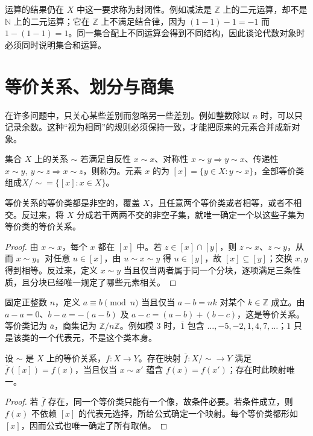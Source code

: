\documentclass[UTF8,12pt,a4paper,fontset=fandol]{ctexbook}
\begin{document}
运算的结果仍在 $X$ 中这一要求称为封闭性。例如减法是 $\mathbb Z$ 上的二元运算，却不是 $\mathbb N$ 上的二元运算；它在 $\mathbb Z$ 上不满足结合律，因为 $(1-1)-1=-1$ 而 $1-(1-1)=1$。同一集合配上不同运算会得到不同结构，因此谈论代数对象时必须同时说明集合和运算。

\section{等价关系、划分与商集}\label{sec:equivalence-quotients}

在许多问题中，只关心某些差别而忽略另一些差别。例如整数除以 $n$ 时，可以只记录余数。这种“视为相同”的规则必须保持一致，才能把原来的元素合并成新对象。

\begin{definition}[等价关系与商集]
集合 $X$ 上的关系 $\sim$ 若满足自反性 $x\sim x$、对称性 $x\sim y\Rightarrow y\sim x$、传递性 $x\sim y,\ y\sim z\Rightarrow x\sim z$，则称为。元素 $x$ 的为 $[x]=\{y\in X:y\sim x\}$，全部等价类组成$X/{\sim}=\{[x]:x\in X\}$。
\end{definition}

\begin{proposition}[等价关系与划分]\label{prop:equivalence-partition}
等价关系的等价类都是非空的，覆盖 $X$，且任意两个等价类或者相等，或者不相交。反过来，将 $X$ 分成若干两两不交的非空子集，就唯一确定一个以这些子集为等价类的等价关系。
\end{proposition}
\begin{proof}
由 $x\sim x$，每个 $x$ 都在 $[x]$ 中。若 $z\in[x]\cap[y]$，则 $z\sim x$、$z\sim y$，从而 $x\sim y$。对任意 $u\in[x]$，由 $u\sim x\sim y$ 得 $u\in[y]$，故 $[x]\subseteq[y]$；交换 $x,y$ 得到相等。反过来，定义 $x\sim y$ 当且仅当两者属于同一个分块，逐项满足三条性质，且分块已经唯一规定了哪些元素相关。
\end{proof}

\begin{example}[整数同余]\label{ex:integer-congruence}
固定正整数 $n$，定义 $a\equiv b\pmod n$ 当且仅当 $a-b=nk$ 对某个 $k\in\mathbb Z$ 成立。由 $a-a=0$、$b-a=-(a-b)$ 及 $a-c=(a-b)+(b-c)$，这是等价关系。等价类记为 $\overline a$，商集记为 $\mathbb Z/n\mathbb Z$。例如模 $3$ 时，$\overline1$ 包含 $\ldots,-5,-2,1,4,7,\ldots$；$1$ 只是该类的一个代表元，不是这个类本身。
\end{example}

\begin{proposition}[通过商集定义映射]\label{prop:quotient-set-map}
设 $\sim$ 是 $X$ 上的等价关系，$f:X\to Y$。存在映射 $\overline f:X/{\sim}\to Y$ 满足 $\overline f([x])=f(x)$，当且仅当 $x\sim x'$ 蕴含 $f(x)=f(x')$；存在时此映射唯一。
\end{proposition}
\begin{proof}
若 $\overline f$ 存在，同一个等价类只能有一个像，故条件必要。若条件成立，则 $f(x)$ 不依赖 $[x]$ 的代表元选择，所给公式确定一个映射。每个等价类都形如 $[x]$，因而公式也唯一确定了所有取值。
\end{proof}
\end{document}
